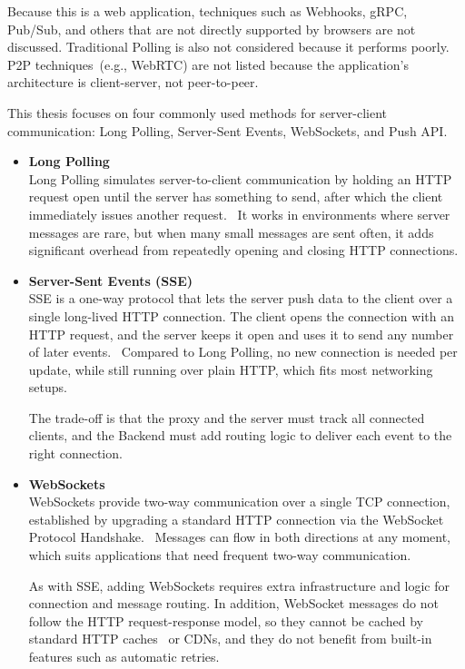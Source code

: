 Because this is a web application, techniques such as Webhooks, gRPC, Pub/Sub, and others that
are not directly supported by browsers are not discussed.
Traditional Polling is also not considered because it performs poorly.~\parencite{server_client_comparison}
P2P techniques~(e.g., WebRTC) are not listed because the application's architecture is client-server,
not peer-to-peer.

This thesis focuses on four commonly used methods for server-client communication:
Long Polling, Server-Sent Events, WebSockets, and Push API\@.
\begin{itemize}
    \item \textbf{Long Polling} \\
    Long Polling simulates server-to-client communication by holding an HTTP
    request open until the server has something to send, after which the
    client immediately issues another request.~\parencite{long_polling}
    It works in environments where server messages are rare, but when
    many small messages are sent often, it adds significant overhead from
    repeatedly opening and closing HTTP connections.~\parencite{server_client_comparison}

    \item \textbf{Server-Sent Events (SSE)} \\
    SSE is a one-way protocol that lets the server push data to the client
    over a single long-lived HTTP connection.
    The client opens the connection with an HTTP request, and the server keeps
    it open and uses it to send any number of later events.~\parencite{sse}
    Compared to Long Polling, no new connection is needed per update, while
    still running over plain HTTP, which fits most networking setups.

    The trade-off is that the proxy and the server must track all connected
    clients, and the Backend must add routing logic to deliver each event to
    the right connection.~\parencite{django_channels}

    \item \textbf{WebSockets} \\
    WebSockets provide two-way communication over a single TCP connection,
    established by upgrading a standard HTTP connection via the WebSocket
    Protocol Handshake.~\parencite{websockets}
    Messages can flow in both directions at any moment, which suits
    applications that need frequent two-way
    communication.~\parencite{server_client_comparison}

    As with SSE, adding WebSockets requires extra infrastructure and logic for
    connection and message routing.
    In addition, WebSocket messages do not follow the HTTP request-response
    model, so they cannot be cached by standard HTTP
    caches~\parencite{http_caching} or CDNs, and they do not benefit from
    built-in features such as automatic retries.


\end{itemize}
